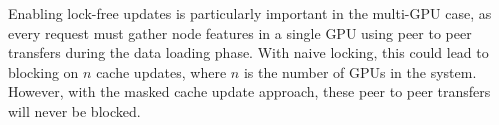 Enabling lock-free updates is particularly important in the multi-GPU case, as every request must gather node features in a single GPU using peer to peer transfers during the data loading phase. With naive locking, this could lead to blocking on $n$ cache updates, where $n$ is the number of GPUs in the system. However, with the masked cache update approach, these peer to peer transfers will never be blocked.



